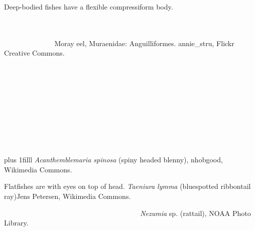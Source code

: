 \documentclass[t]{beamer}
\begin{document}
{
\begin{frame}[b,plain]{Deep-bodied fishes have a flexible \textcolor{orange6}{compressiform} body.}
\hfill\tiny\textcolor{white}{\textit{Chaetodon melannotus}, Leonard Low, Flickr Creative Commons.}
\end{frame}
}

{
\begin{frame}[b,plain]{\textcolor{white}{Eel-like fishes have reduced or absent paired fins. Median fins may be confluent with caudal fin.}}
\hfill\tiny\textcolor{orange7}{Moray eel, Muraenidae: Anguilliformes. annie\_stru, Flickr Creative Commons.}
\end{frame}
}



{
\begin{frame}[b,plain]{\textcolor{white}{Bottom-rovers are ventrally flattened with terminal to inferior mouths.}}
\hfill\tiny\textcolor{white}{\textit{File:Upeneichthys lineatus} (blue-lined goatfish, Ian Skipworth, Wikimedia Commons.}
\end{frame}
}

{
\begin{frame}[b,plain]{\textcolor{white}{Bottom clingers are small with fused pelvic fins.}}
\hfill\tiny\textcolor{white}{\textit{Cryptocentrus cinctus} (yellow prawn-goby), Nicolas Keller, Flickr Creative Commons.}
\end{frame}
}

{
\begin{frame}[t,plain]{}

\hangpara\Large\textcolor{white}{Bottom hiders are small \\
and live in crevices.}

\vskip0pt plus 1filll
\tiny\textcolor{white!80!black}{\textit{Acanthemblemaria spinosa} (spiny headed blenny), nhobgood, Wikimedia Commons.}
\end{frame}
}

{
\begin{frame}[b,plain]{Flatfishes are  with eyes on top of head.}
\tiny\textit{Taeniura lymma} (bluespotted ribbontail ray)\hfill Jens Petersen, Wikimedia Commons.
\end{frame}
}


{
\begin{frame}[b,plain]{\textcolor{white}{Rattails have large heads and tapered tails.}}
\tiny\textcolor{white!80!black}{\textit{Nezumia} sp. (rattail), NOAA Photo Library.}
\end{frame}
}
\end{document}
